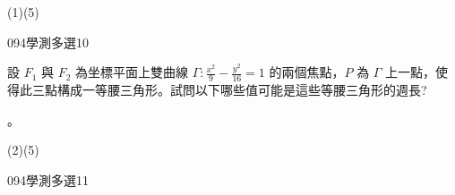 \begin{QUESTIONS}
\begin{QUESTION}
\begin{QBODY}
        \end{QBODY}
        \begin{QFROMS}
        \end{QFROMS}
        \begin{QTAGS}\end{QTAGS}
        \begin{QANS}
            (1)(5)
        \end{QANS}
        \begin{QSOLLIST}
        \end{QSOLLIST}
        \begin{QEMPTYSPACE}
        \end{QEMPTYSPACE}
    \end{QUESTION}
    \begin{QUESTION}
        \begin{ExamInfo}{094}{學測}{多選}{10}
        \end{ExamInfo}
        \begin{ExamAnsRateInfo}{29}{47}{23}{17}
        \end{ExamAnsRateInfo}
        \begin{QBODY}
			設 $F_1$ 與 $F_2$ 為坐標平面上雙曲線 $\Gamma : \frac{x^2}{9} -\frac{y^2}{16} =1$ 的兩個焦點，$P$ 為 $\Gamma$ 上一點，使得此三點構成一等腰三角形。試問以下哪些值可能是這些等腰三角形的週長? 
			\begin{QOPS} 
				 。
			\end{QOPS}
        \end{QBODY}
        \begin{QFROMS}
        \end{QFROMS}
        \begin{QTAGS}\end{QTAGS}
        \begin{QANS}
            (2)(5)
        \end{QANS}
        \begin{QSOLLIST}
        \end{QSOLLIST}
        \begin{QEMPTYSPACE}
        \end{QEMPTYSPACE}
    \end{QUESTION}
    \begin{QUESTION}
        \begin{ExamInfo}{094}{學測}{多選}{11}
        \end{ExamInfo}
        \begin{ExamAnsRateInfo}{32}{51}{30}{15}

\end{ExamAnsRateInfo}
\end{QUESTION}
\end{QUESTIONS}
